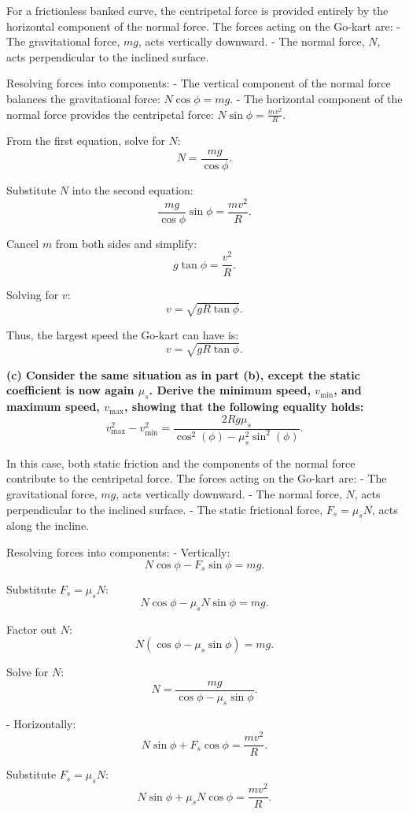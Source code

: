 \documentclass{article}
\begin{document}
For a frictionless banked curve, the centripetal force is provided entirely by the horizontal component of the normal force. The forces acting on the Go-kart are:
- The gravitational force, $mg$, acts vertically downward.
- The normal force, $N$, acts perpendicular to the inclined surface.

Resolving forces into components:
- The vertical component of the normal force balances the gravitational force: $N \cos\phi = mg$.
- The horizontal component of the normal force provides the centripetal force: $N \sin\phi = \frac{mv^2}{R}$.

From the first equation, solve for $N$:
\[
N = \frac{mg}{\cos\phi}.
\]

Substitute $N$ into the second equation:
\[
\frac{mg}{\cos\phi} \sin\phi = \frac{mv^2}{R}.
\]

Cancel $m$ from both sides and simplify:
\[
g \tan\phi = \frac{v^2}{R}.
\]

Solving for $v$:
\[
v = \sqrt{gR \tan\phi}.
\]

Thus, the largest speed the Go-kart can have is:
\[
\boxed{v = \sqrt{gR \tan\phi}}.
\]

\textbf{(c) Consider the same situation as in part (b), except the static coefficient is now again $\mu_s$. Derive the minimum speed, $v_{\text{min}}$, and maximum speed, $v_{\text{max}}$, showing that the following equality holds:}
\[
v_{\text{max}}^2 - v_{\text{min}}^2 = \frac{2Rg\mu_s}{\cos^2(\phi) - \mu_s^2\sin^2(\phi)}.
\]

In this case, both static friction and the components of the normal force contribute to the centripetal force. The forces acting on the Go-kart are:
- The gravitational force, $mg$, acts vertically downward.
- The normal force, $N$, acts perpendicular to the inclined surface.
- The static frictional force, $F_s = \mu_s N$, acts along the incline.

Resolving forces into components:
- Vertically:
\[
N \cos\phi - F_s \sin\phi = mg.
\]

Substitute $F_s = \mu_s N$:
\[
N \cos\phi - \mu_s N \sin\phi = mg.
\]

Factor out $N$:
\[
N (\cos\phi - \mu_s \sin\phi) = mg.
\]

Solve for $N$:
\[
N = \frac{mg}{\cos\phi - \mu_s \sin\phi}.
\]

- Horizontally:
\[
N \sin\phi + F_s \cos\phi = \frac{mv^2}{R}.
\]

Substitute $F_s = \mu_s N$:
\[
N \sin\phi + \mu_s N \cos\phi = \frac{mv^2}{R}.
\]
\end{document}

